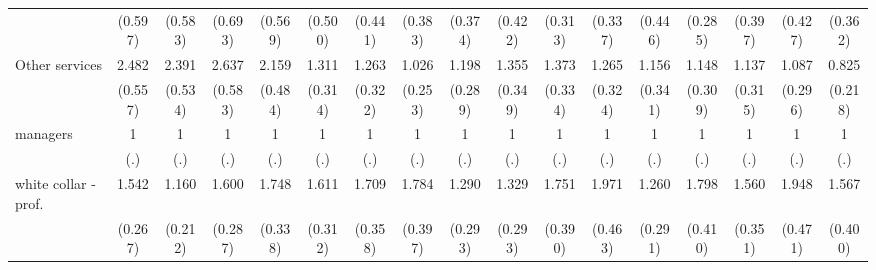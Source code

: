 {\begin{tabular}{l*{16}{c}}
                    &     (0.597)         &     (0.583)         &     (0.693)         &     (0.569)         &     (0.500)         &     (0.441)         &     (0.383)         &     (0.374)         &     (0.422)         &     (0.313)         &     (0.337)         &     (0.446)         &     (0.285)         &     (0.397)         &     (0.427)         &     (0.362)         \\
[1em]
Other services      &       2.482\sym{***}&       2.391\sym{***}&       2.637\sym{***}&       2.159\sym{***}&       1.311         &       1.263         &       1.026         &       1.198         &       1.355         &       1.373         &       1.265         &       1.156         &       1.148         &       1.137         &       1.087         &       0.825         \\
                    &     (0.557)         &     (0.534)         &     (0.583)         &     (0.484)         &     (0.314)         &     (0.322)         &     (0.253)         &     (0.289)         &     (0.349)         &     (0.334)         &     (0.324)         &     (0.341)         &     (0.309)         &     (0.315)         &     (0.296)         &     (0.218)         \\
[1em]
managers            &           1         &           1         &           1         &           1         &           1         &           1         &           1         &           1         &           1         &           1         &           1         &           1         &           1         &           1         &           1         &           1         \\
                    &         (.)         &         (.)         &         (.)         &         (.)         &         (.)         &         (.)         &         (.)         &         (.)         &         (.)         &         (.)         &         (.)         &         (.)         &         (.)         &         (.)         &         (.)         &         (.)         \\
[1em]
white collar - prof.&       1.542\sym{*}  &       1.160         &       1.600\sym{**} &       1.748\sym{**} &       1.611\sym{*}  &       1.709\sym{*}  &       1.784\sym{**} &       1.290         &       1.329         &       1.751\sym{*}  &       1.971\sym{**} &       1.260         &       1.798\sym{*}  &       1.560\sym{*}  &       1.948\sym{**} &       1.567         \\
                    &     (0.267)         &     (0.212)         &     (0.287)         &     (0.338)         &     (0.312)         &     (0.358)         &     (0.397)         &     (0.293)         &     (0.293)         &     (0.390)         &     (0.463)         &     (0.291)         &     (0.410)         &     (0.351)         &     (0.471)         &     (0.400)         \\

\end{tabular}}
